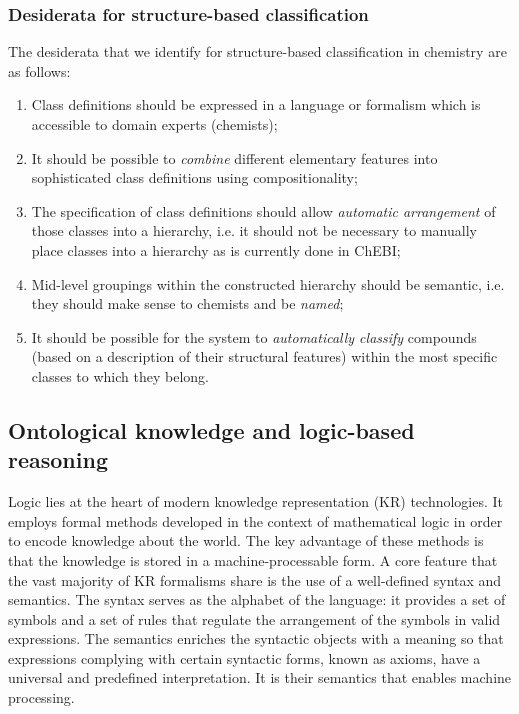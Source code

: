 \documentclass[10pt]{bmc_article}
\newenvironment{bmcformat}{\baselineskip20pt\sloppy\setboolean{publ}{false}}{\baselineskip20pt\sloppy}
\begin{document}
\begin{bmcformat}
\subsubsection*{Desiderata for structure-based classification}
The desiderata that we identify for structure-based classification in chemistry are as follows:
\begin{enumerate}
	\item Class definitions should be expressed in a language or formalism which is accessible to domain experts (chemists);
  \item It should be possible to \textit{combine} different elementary features into sophisticated class definitions using compositionality;	
	\item The specification of class definitions should allow \textit{automatic arrangement} of those classes into a hierarchy, i.e. it should not be necessary to manually place classes into a hierarchy as is currently done in ChEBI;
	\item Mid-level groupings within the constructed hierarchy should be semantic, i.e. they should make sense to chemists and be \textit{named};
	\item It should be possible for the system to \textit{automatically classify} compounds (based on a description of their structural features) within the most specific classes to which they belong. 
\end{enumerate}


\subsection*{Ontological knowledge and logic-based reasoning}
\label{sec:backlogic}

Logic lies at the heart of modern knowledge representation (KR) technologies. It employs formal methods developed in the context of mathematical logic in order to encode knowledge about the world. The key advantage of these methods is that the knowledge is stored in a machine-processable form. A core feature that the vast majority of KR formalisms share is the use of a well-defined syntax and semantics. The syntax serves as the alphabet of the language: it provides a set of symbols and a set of rules that regulate the arrangement of the symbols in valid expressions. The semantics enriches the syntactic objects with a meaning so that expressions complying with certain syntactic forms, known as axioms, have a universal and predefined interpretation. It is their semantics that enables machine processing.


\end{bmcformat}
\end{document}

